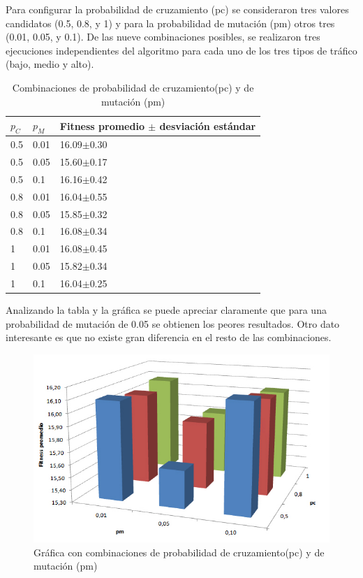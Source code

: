 Para configurar la probabilidad de cruzamiento (pc) se consideraron tres valores candidatos (0.5, 0.8, y 1) y para la probabilidad de mutación (pm) otros tres (0.01,  0.05,  y  0.1). De las nueve combinaciones posibles, se realizaron tres ejecuciones independientes  del  algoritmo para cada uno de los tres tipos de tráfico (bajo, medio y alto).  
 
 \begin{table}[H]
 	\renewcommand{\arraystretch}{1.2}
 	\caption{Combinaciones de probabilidad de cruzamiento(pc) y de mutación (pm)}
 	\label{table:parametro_mutacion_cruzamiento}
 	\centering
 	\begin{tabular}{p{1cm}p{1cm}p{3.5cm} }
 		\hline
 		$p_C$& 
 		$p_M$ & 
 		Fitness promedio  $\pm$ desviación estándar\\ 
 		\hline
 		0.5 & 0.01  &  16.09$\pm$0.30\\
 		0.5 & 0.05 &  15.60$\pm$0.17\\
 		0.5 & 0.1  &  16.16$\pm$0.42\\
 		0.8 & 0.01  &  16.04$\pm$0.55\\
 		0.8 & 0.05  &  15.85$\pm$0.32\\
 		0.8 & 0.1  &  16.08$\pm$0.34\\
 		1 & 0.01 &  16.08$\pm$0.45\\
 		1 & 0.05 &  15.82$\pm$0.34\\
 		1 & 0.1 &  16.04$\pm$0.25\\
 		\hline
 	\end{tabular}
 \end{table}
 
Analizando la tabla y la gráfica se puede apreciar claramente que para una probabilidad de mutación de 0.05 se obtienen los peores resultados. Otro dato interesante es que no existe gran diferencia en el resto de las combinaciones.

\begin{figure}[H]
	\centering
	\includegraphics[width=0.8\linewidth]{Figures/grafica_mutacion_cruzamiento}
	\caption{Gráfica con combinaciones de probabilidad de cruzamiento(pc) y de mutación (pm)}
	\label{fig:grafica_mutacion_cruzamiento}
\end{figure}


